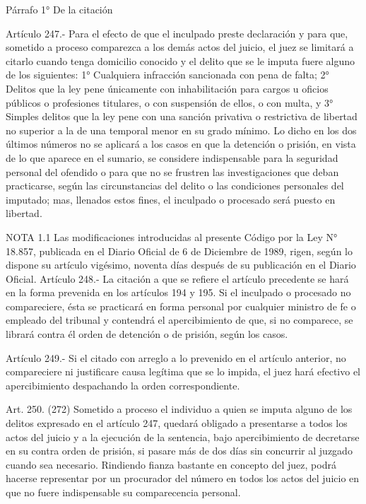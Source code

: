   Párrafo 1°
  De la citación

    Artículo 247.- Para el efecto de que el inculpado preste declaración y para que, sometido a proceso comparezca a los demás actos del juicio, el juez se limitará a citarlo cuando tenga domicilio conocido y el delito que se le imputa fuere alguno de los siguientes:
    1° Cualquiera infracción sancionada con pena de falta;
    2° Delitos que la ley pene únicamente con inhabilitación para cargos u oficios públicos o profesiones titulares, o con suspensión de ellos, o con multa, y
    3° Simples delitos que la ley pene con una sanción privativa o restrictiva de libertad no superior a la de una temporal menor en su grado mínimo.
    Lo dicho en los dos últimos números no se aplicará a los casos en que la detención o prisión, en vista de lo que aparece en el sumario, se considere indispensable para la seguridad personal del ofendido o para que no se frustren las investigaciones que deban practicarse, según las circunstancias del delito o las condiciones personales del imputado; mas, llenados estos fines, el inculpado o procesado será puesto en libertad.





NOTA 1.1
    Las modificaciones introducidas al presente Código por la Ley N° 18.857, publicada en el Diario Oficial de 6 de Diciembre de 1989, rigen, según lo dispone su artículo vigésimo, noventa días después de su publicación en el Diario Oficial.
    Artículo 248.- La citación a que se refiere el artículo precedente se hará en la forma prevenida en los artículos 194 y 195. Si el inculpado o procesado no compareciere, ésta se practicará en forma personal por cualquier ministro de fe o empleado del tribunal y contendrá el apercibimiento de que, si no comparece, se librará contra él orden de detención o de prisión, según los casos.

    Artículo 249.- Si el citado con arreglo a lo prevenido en el artículo anterior, no compareciere ni justificare causa legítima que se lo impida, el juez hará efectivo el apercibimiento despachando la orden correspondiente.

    Art. 250. (272) Sometido a proceso el individuo a quien se imputa alguno de los delitos expresado en el artículo 247, quedará obligado a presentarse a todos los actos del juicio y a la ejecución de la sentencia, bajo apercibimiento de decretarse en su contra orden de prisión, si pasare más de dos días sin concurrir al juzgado cuando sea necesario.
    Rindiendo fianza bastante en concepto del juez, podrá hacerse representar por un procurador del número en todos los actos del juicio en que no fuere indispensable su comparecencia personal.

